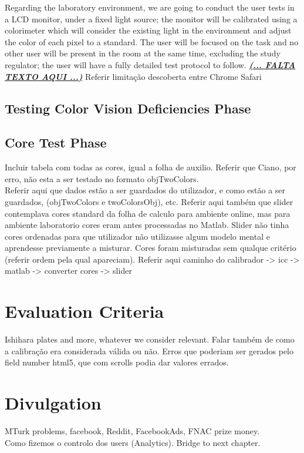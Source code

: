 %
Regarding the laboratory environment, we are going to conduct the user tests in a LCD monitor, under a fixed light source; the monitor will be calibrated
using a colorimeter which will consider the existing light in the environment and adjust the color of each pixel to a standard. The user will be focused on
the task and no other user will be present in the room at the same time, excluding the study regulator; the user will have a fully detailed test protocol to
follow.
%
\textbf{\underline{\emph{(... FALTA TEXTO AQUI ...)}}}
%
Referir limitação descoberta entre Chrome Safari
%
\subsection{Testing Color Vision Deficiencies Phase}
\label{subsec:design_ishihara}
%
\subsection{Core Test Phase}
\label{subsec:design_core}
%
Incluir tabela com todas as cores, igual a folha de auxilio. Referir que Ciano, por erro, não esta a ser testado no formato objTwoColors. \\
Referir aqui que dados estão a ser guardados do utilizador, e como estão a ser guardados, (objTwoColors e twoColorsObj), etc.
Referir aqui também que slider contemplava cores standard da folha de calculo para ambiente online,
mas para ambiente laboratorio cores eram antes processadas no Matlab. Slider não tinha cores ordenadas para que utilizador não utilizasse
algum modelo mental e aprendesse previamente a misturar. Cores foram misturadas sem qualque critério (referir ordem pela qual apareciam).
Referir aqui caminho do calibrador -> icc -> matlab -> converter cores -> slider
%
\section{Evaluation Criteria}
\label{sec:impl_evaluationcriteria}
Ishihara plates and more, whatever we consider relevant. Falar também de como a calibração era considerada válida ou não. Erros
que poderiam ser gerados pelo field number html5, que com scrolls podia dar valores errados. \\

\section{Divulgation}
\label{sec:impl_divulgation}
MTurk problems, facebook, Reddit, FacebookAds, FNAC prize money. \\
Como fizemos o controlo dos users (Analytics).
Bridge to next chapter.
